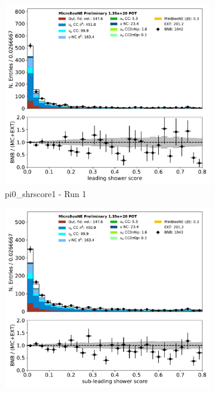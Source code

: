 \documentclass[a4paper]{article}
\begin{document}
\begin{figure}[H] 
\begin{center}
    \begin{subfigure}[b]{0.3\textwidth}
    \centering
    \includegraphics[width=1.00\textwidth]{pi0/pi0_shrscore1_01152020_inputs_RUN1.pdf}
    \caption{\label{fig:pi0:inputs:shrscore1:RUN1} pi0\_shrscore1 - Run 1 }
    \end{subfigure}
    \begin{subfigure}[b]{0.3\textwidth}
    \centering
    \includegraphics[width=1.00\textwidth]{pi0/pi0_shrscore2_01152020_inputs_RUN1.pdf}

\end{subfigure}
\end{center}
\end{figure}
\end{document}
